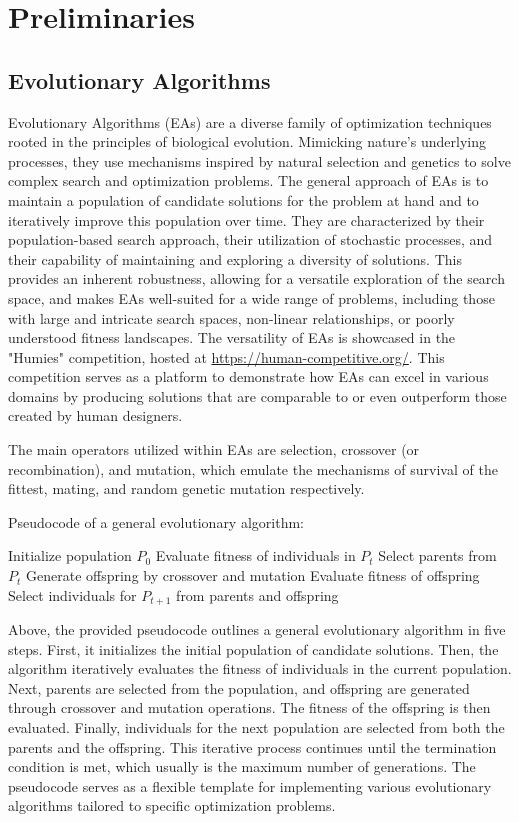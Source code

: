 \documentclass[twoside]{ctuthesis}
\theoremstyle{plain}
\theoremstyle{definition}
\theoremstyle{note}
\begin{document}
\chapter{Preliminaries}


\section{Evolutionary Algorithms}
\label{sec:evolutionbasic}

Evolutionary Algorithms (EAs) are a diverse family of optimization techniques rooted in the principles of biological evolution. Mimicking nature's underlying processes, they use mechanisms inspired by natural selection and genetics to solve complex search and optimization problems. The general approach of EAs is to maintain a population of candidate solutions for the problem at hand and to iteratively improve this population over time. They are characterized by their population-based search approach, their utilization of stochastic processes, and their capability of maintaining and exploring a diversity of solutions. This provides an inherent robustness, allowing for a versatile exploration of the search space, and makes EAs well-suited for a wide range of problems, including those with large and intricate search spaces, non-linear relationships, or poorly understood fitness landscapes. The versatility of EAs is showcased in the "Humies" competition, hosted at \url{https://human-competitive.org/}. This competition serves as a platform to demonstrate how EAs can excel in various domains by producing solutions that are comparable to or even outperform those created by human designers.

The main operators utilized within EAs are selection, crossover (or recombination), and mutation, which emulate the mechanisms of survival of the fittest, mating, and random genetic mutation respectively.

Pseudocode of a general evolutionary algorithm:
\begin{algorithmic}[1]
	\State Initialize population $P_0$
	\State Evaluate fitness of individuals in $P_t$
	\State Select parents from $P_t$
	\State Generate offspring by crossover and mutation
	\State Evaluate fitness of offspring
	\State Select individuals for $P_{t+1}$ from parents and offspring
	\EndWhile
\end{algorithmic}

Above, the provided pseudocode outlines a general evolutionary algorithm in five steps. First, it initializes the initial population of candidate solutions. Then, the algorithm iteratively evaluates the fitness of individuals in the current population. Next, parents are selected from the population, and offspring are generated through crossover and mutation operations. The fitness of the offspring is then evaluated. Finally, individuals for the next population are selected from both the parents and the offspring. This iterative process continues until the termination condition is met, which usually is the maximum number of generations. The pseudocode serves as a flexible template for implementing various evolutionary algorithms tailored to specific optimization problems.
\end{document}
